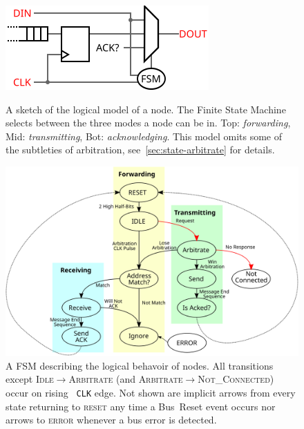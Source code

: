 \begin{figure}[h]
  \begin{minipage}[b]{.48\linewidth}
    \centering
    \includegraphics[width=\textwidth]{img/logical}
    \caption{A sketch of the logical model of a node. The Finite State Machine
  selects between the three modes a node can be in. Top: {\em forwarding}, Mid:
  {\em transmitting}, Bot: {\em acknowledging}. This model omits some of the
  subtleties of arbitration, see~\ref{sec:state-arbitrate} for details.
    }
    \label{fig:logical}
  \end{minipage}
  \hspace{1 em}
  \begin{minipage}[b]{.48\linewidth}
    \centering
    \label{fig:states}
  \end{minipage}
\end{figure}

\begin{figure}[h]
  \includegraphics[width=\linewidth]{img/fsm_diagram}
  \caption{A FSM describing the logical behavoir of \bus nodes. All
transitions except \textsc{Idle}$\rightarrow$\textsc{Arbitrate} (and
\textsc{Arbitrate}$\rightarrow$\textsc{Not\_Connected}) occur on rising {\tt
CLK} edge. Not shown are implicit arrows from every state returning to
\textsc{reset} any time a Bus~Reset event occurs nor arrows to \textsc{error}
whenever a bus error is detected.
}
\end{figure}

